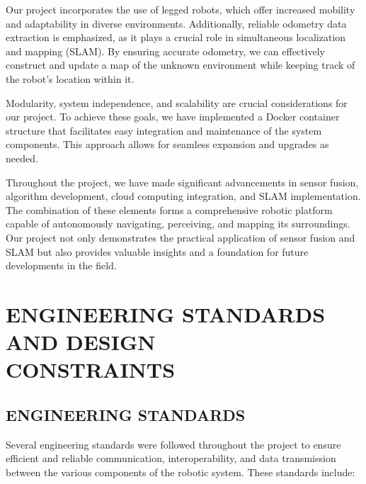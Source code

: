 \documentclass[12pt]{article}
\begin{document}
Our project incorporates the use of legged robots, which offer increased mobility and adaptability in diverse environments. Additionally, reliable odometry data extraction is emphasized, as it plays a crucial role in simultaneous localization and mapping (SLAM). By ensuring accurate odometry, we can effectively construct and update a map of the unknown environment while keeping track of the robot's location within it. 

Modularity, system independence, and scalability are crucial considerations for our project. To achieve these goals, we have implemented a Docker container structure that facilitates easy integration and maintenance of the system components. This approach allows for seamless expansion and upgrades as needed. 

Throughout the project, we have made significant advancements in sensor fusion, algorithm development, cloud computing integration, and SLAM implementation. The combination of these elements forms a comprehensive robotic platform capable of autonomously navigating, perceiving, and mapping its surroundings. Our project not only demonstrates the practical application of sensor fusion and SLAM but also provides valuable insights and a foundation for future developments in the field.


\section{ENGINEERING STANDARDS AND DESIGN \\ CONSTRAINTS}

\subsection{ENGINEERING STANDARDS}

Several engineering standards were followed throughout the project to ensure efficient and reliable communication, interoperability, and data transmission between the various components of the robotic system. These standards include: 
\end{document}
